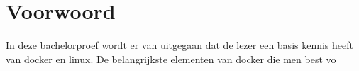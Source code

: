 \chapter*{Voorwoord}
\label{ch:voorwoord}


In deze bachelorproef wordt er van uitgegaan dat de lezer een basis kennis heeft van docker en linux. De belangrijkste elementen van docker die men best vo


\tableofcontents



